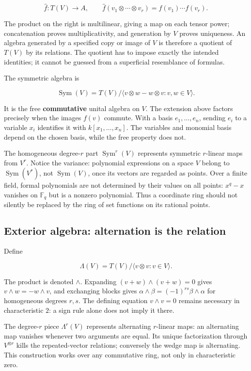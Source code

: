 \documentclass[
  11pt,
]{article}
\begin{document}
\[\widehat f:T(V)\to A,\qquad
\widehat f(v_1\otimes\cdots\otimes v_r)=f(v_1)\cdots f(v_r).\]

The product on the right is multilinear, giving a map on each tensor
power; concatenation proves multiplicativity, and generation by \(V\)
proves uniqueness. An algebra generated by a specified copy or image of
\(V\) is therefore a quotient of \(T(V)\) by its relations. The quotient
has to impose exactly the intended identities; it cannot be guessed from
a superficial resemblance of formulas.

The symmetric algebra is

\[\operatorname{Sym}(V)=T(V)/\langle v\otimes w-w\otimes v:v,w\in V\rangle.\]

It is the free \textbf{commutative} unital algebra on \(V\). The
extension above factors precisely when the images \(f(v)\) commute. With
a basis \(e_1,\ldots,e_n\), sending \(e_i\) to a variable \(x_i\)
identifies it with \(k[x_1,\ldots,x_n]\). The variables and monomial
basis depend on the chosen basis, while the free property does not.

The homogeneous degree-\(r\) part \(\operatorname{Sym}^r(V)\) represents
symmetric \(r\)-linear maps from \(V^r\). Notice the variance:
polynomial expressions on a space \(V\) belong to
\(\operatorname{Sym}(V^*)\), not \(\operatorname{Sym}(V)\), once its
vectors are regarded as points. Over a finite field, formal polynomials
are not determined by their values on all points: \(x^q-x\) vanishes on
\(\mathbb F_q\) but is a nonzero polynomial. Thus a coordinate ring
should not silently be replaced by the ring of set functions on its
rational points.

\subsection{Exterior algebra: alternation is the
relation}\label{exterior-algebra-alternation-is-the-relation}

Define

\[\Lambda(V)=T(V)/\langle v\otimes v:v\in V\rangle.\]

The product is denoted \(\wedge\). Expanding \((v+w)\wedge(v+w)=0\)
gives \(v\wedge w=-w\wedge v\), and exchanging blocks gives
\(\alpha\wedge\beta=(-1)^{rs}\beta\wedge\alpha\) for homogeneous degrees
\(r,s\). The defining equation \(v\wedge v=0\) remains necessary in
characteristic \(2\): a sign rule alone does not imply it there.

The degree-\(r\) piece \(\Lambda^r(V)\) represents alternating
\(r\)-linear maps: an alternating map vanishes whenever two arguments
are equal. Its unique factorization through \(V^{\otimes r}\) kills the
repeated-vector relations; conversely the wedge map is alternating. This
construction works over any commutative ring, not only in characteristic
zero.
\end{document}
